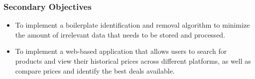 \subsubsection{Secondary Objectives}\label{subsubsec:secondary-objectives}

\begin{itemize}
    \item To implement a boilerplate identification and removal algorithm to minimize the amount of irrelevant data that needs to be stored and processed.
    \item To implement a web-based application that allows users to search for products and view their historical prices across different platforms, as well as compare prices and identify the best deals available.
\end{itemize}
